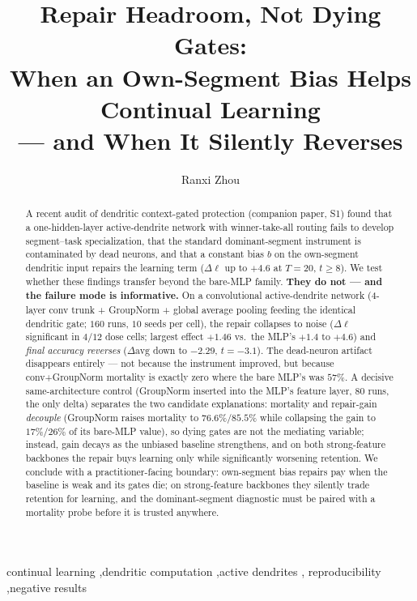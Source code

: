 \documentclass[review]{elsarticle}
\begin{document}
\begin{frontmatter}

\title{Repair Headroom, Not Dying Gates:\\
When an Own-Segment Bias Helps Continual Learning\\
--- and When It Silently Reverses}

\author[inst1]{Ranxi Zhou}

\begin{abstract}
A recent audit of dendritic context-gated protection (companion paper,
S1) found that a one-hidden-layer active-dendrite network with
winner-take-all routing fails to develop segment--task specialization,
that the standard dominant-segment instrument is contaminated by dead
neurons, and that a constant bias $b$ on the own-segment dendritic
input repairs the learning term ($\Delta\ell$ up to $+4.6$ at
$T{=}20$, $t \ge 8$). We test whether these findings transfer beyond
the bare-MLP family. \textbf{They do not --- and the failure mode is
informative.} On a convolutional active-dendrite network
(4-layer conv trunk + GroupNorm + global average pooling feeding the
identical dendritic gate; $160$ runs, $10$ seeds per cell), the
repair collapses to noise ($\Delta\ell$ significant in $4/12$ dose
cells; largest effect $+1.46$ vs.\ the MLP's $+1.4$ to $+4.6$) and
\emph{final accuracy reverses} ($\Delta\mathrm{avg}$ down to $-2.29$,
$t{=}-3.1$). The dead-neuron artifact disappears entirely --- not
because the instrument improved, but because conv+GroupNorm mortality
is exactly zero where the bare MLP's was $57\%$. A decisive
same-architecture control (GroupNorm inserted into the MLP's feature
layer, $80$ runs, the only delta) separates the two candidate
explanations: mortality and repair-gain \emph{decouple} (GroupNorm
raises mortality to $76.6\%$/$85.5\%$ while collapsing the gain to
$17\%$/$26\%$ of its bare-MLP value), so dying gates are not the
mediating variable; instead, gain decays as the unbiased baseline
strengthens, and on both strong-feature backbones the repair buys
learning only while significantly worsening retention. We conclude
with a practitioner-facing boundary: own-segment bias repairs pay
when the baseline is weak and its gates die; on strong-feature
backbones they silently trade retention for learning, and the
dominant-segment diagnostic must be paired with a mortality probe
before it is trusted anywhere.
\end{abstract}

\begin{keyword}
continual learning \sep dendritic computation \sep active dendrites \sep
reproducibility \sep negative results
\end{keyword}

\end{frontmatter}
\end{document}
